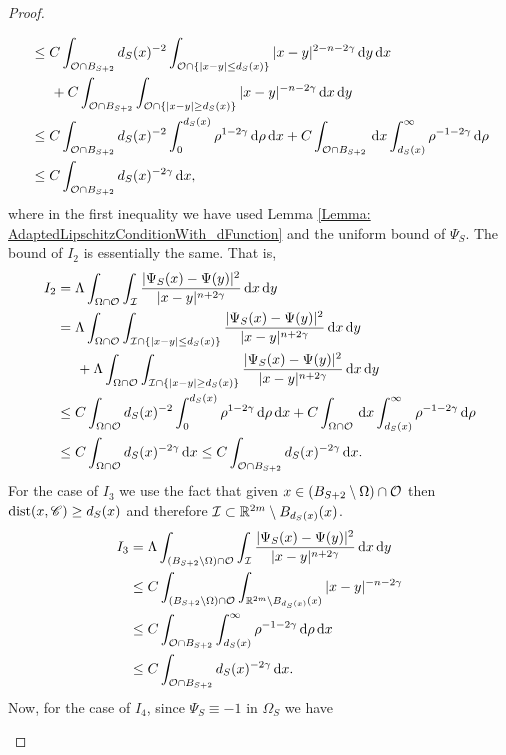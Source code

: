 \begin{proof}
\begin{itemize}
\begin{align*}
&\leq C \int_{\mathcal{O} \cap B_{S+2}} d_S(x)^{-2}\int_{\mathcal{O}\cap\{|x-y|\leq d_S(x)\}} |x-y|^{2-n-2\gamma} \,\mathrm{d} y\,\mathrm{d} x\\
&\hspace{5mm} + C \int_{\mathcal{O} \cap B_{S+2}} \int_{\mathcal{O}\cap\{|x-y|\geq d_S(x)\}} |x-y|^{-n-2\gamma} \,\mathrm{d} x\,\mathrm{d} y\\
&\leq C \int_{\mathcal{O} \cap B_{S+2}} d_S(x)^{-2}\int_0^{d_S(x)} \rho^{1-2\gamma} \,\mathrm{d} \rho\,\mathrm{d} x + C \int_{\mathcal{O} \cap B_{S+2}} \,\mathrm{d} x \int_{d_S(x)}^\infty \rho^{-1-2\gamma} \,\mathrm{d}\rho\\
&\leq C \int_{\mathcal{O} \cap B_{S+2}} d_S(x)^{-2\gamma} \,\mathrm{d} x,
\end{align*}
where in the first inequality we have used Lemma \ref{Lemma: AdaptedLipschitzConditionWith_dFunction} and the uniform bound of $\Psi_S$. The bound of $I_2$ is essentially the same. That is,
\begin{align*}
I_2 &= \Lambda \int_{\Omega \cap \mathcal{O}} \int_{\mathcal{I}} \frac{|\Psi_S(x)-\Psi(y)|^2}{|x-y|^{n+2\gamma}} \,\mathrm{d} x\,\mathrm{d} y\\
&= \Lambda \int_{\Omega \cap \mathcal{O}} \int_{\mathcal{I}\cap\{|x-y|\leq d_S(x)\}} \frac{|\Psi_S(x)-\Psi(y)|^2}{|x-y|^{n+2\gamma}} \,\mathrm{d} x\,\mathrm{d} y\\
&\hspace{5mm} + \Lambda \int_{\Omega \cap \mathcal{O}} \int_{\mathcal{I}\cap\{|x-y|\geq d_S(x)\}} \frac{|\Psi_S(x)-\Psi(y)|^2}{|x-y|^{n+2\gamma}} \,\mathrm{d} x\,\mathrm{d} y\\
&\leq C \int_{\Omega \cap \mathcal{O}} d_S(x)^{-2}\int_0^{d_S(x)} \rho^{1-2\gamma} \,\mathrm{d} \rho\,\mathrm{d} x + C \int_{\Omega \cap \mathcal{O}} \,\mathrm{d} x \int_{d_S(x)}^\infty \rho^{-1-2\gamma} \,\mathrm{d}\rho\\
&\leq C \int_{\Omega \cap \mathcal{O}} d_S(x)^{-2\gamma} \,\mathrm{d} x \leq C \int_{\mathcal{O} \cap B_{S+2}} d_S(x)^{-2\gamma} \,\mathrm{d} x.
\end{align*}
For the case of $I_3$ we use the fact that given $x\in (B_{S+2}\setminus \Omega)\cap \mathcal{O}$ then $\operatorname{dist}(x,\mathscr{C})\geq d_S(x)$ and therefore $\mathcal{I} \subset \mathbb{R}^{2m}\setminus B_{d_S(x)}(x)$.
\begin{align*}
I_3 &= \Lambda \int_{(B_{S+2}\setminus \Omega) \cap \mathcal{O}} \int_{\mathcal{I}} \frac{|\Psi_S(x)-\Psi(y)|^2}{|x-y|^{n+2\gamma}} \,\mathrm{d} x\,\mathrm{d} y\\
&\leq C \int_{(B_{S+2}\setminus \Omega) \cap \mathcal{O}} \int_{\mathbb{R}^{2m}\setminus B_{d_S(x)}(x)} |x-y|^{-n-2\gamma} \\
&\leq C \int_{\mathcal{O} \cap B_{S+2}} \int_{d_S(x)}^\infty \rho^{-1-2\gamma} \,\mathrm{d} \rho\,\mathrm{d} x \\
&\leq C \int_{\mathcal{O} \cap B_{S+2}} d_S(x)^{-2\gamma} \,\mathrm{d} x.
\end{align*}
Now, for the case of $I_4$, since $\Psi_S\equiv -1$ in $\Omega_S$ we have

\end{itemize}
\end{proof}
